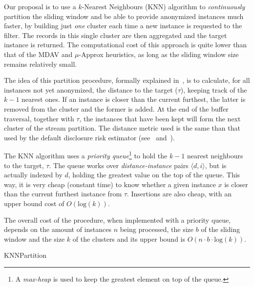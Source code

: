 Our proposal is to use a $k$-Nearest Neighbours (KNN) algorithm to \textit{continuously} partition the sliding window and be able to provide anonymized instances much faster, by building just \textit{one} cluster each time a new instance is requested to the filter. The records in this single cluster are then aggregated and the target instance is returned. The computational cost of this approach is quite lower than that of the MDAV and $\mu$-Approx heuristics, as long as the sliding window size remains relatively small.

The idea of this partition procedure, formally explained in~, is to calculate, for all instances not yet anonymized, the distance to the target ($\tau$), keeping track of the $k-1$ nearest ones. If an instance is closer than the current furthest, the latter is removed from the cluster and the former is added. At the end of the buffer traversal, together with $\tau$, the instances that have been kept will form the next cluster of the stream partition. The distance metric used is the same than that used by the default disclosure risk estimator (see~ and~).

The KNN algorithm uses a \textit{priority queue}\footnote{A \textit{max-heap} is used to keep the greatest element on top of the queue.} to hold the $k-1$ nearest neighbours to the target, $\tau$. The queue works over \textit{distance-instance} pairs $\langle d, i\rangle$, but is actually indexed by $d$, holding the greatest value on the top of the queue. This way, it is very cheap (constant time) to know whether a given instance $x$ is closer than the current furthest instance from $\tau$. Insertions are also cheap, with an upper bound cost of $O(\mathrm{log}(k))$.

The overall cost of the procedure, when implemented with a priority queue, depends on the amount of instances $n$ being processed, the size $b$ of the sliding window and the size $k$ of the clusters and its upper bound is $O(n \cdot b \cdot \mathrm{log}(k))$.

\begin{algorithm}
\caption{KNNPartition\label{al:KNN-partition}}
\end{algorithm}


